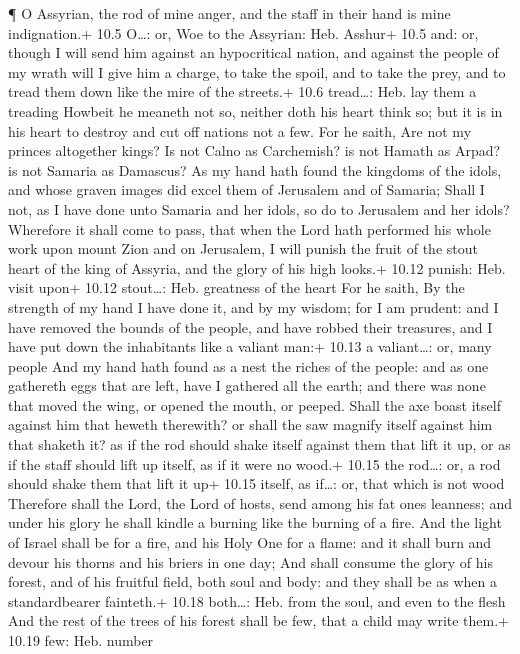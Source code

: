  ¶ O Assyrian, the rod of mine anger, and the staff in their
hand is mine indignation.+ 10.5 O\ldots: or, Woe to the Assyrian: Heb.
Asshur+ 10.5 and: or, though  I will send him against an
hypocritical nation, and against the people of my wrath will I give him
a charge, to take the spoil, and to take the prey, and to tread them
down like the mire of the streets.+ 10.6 tread\ldots: Heb. lay them a
treading  Howbeit he meaneth not so, neither doth his heart
think so; but it is in his heart to destroy and cut off nations not a
few.  For he saith, Are not my princes altogether kings?
 Is not Calno as Carchemish? is not Hamath as Arpad? is not
Samaria as Damascus?  As my hand hath found the kingdoms of
the idols, and whose graven images did excel them of Jerusalem and of
Samaria;  Shall I not, as I have done unto Samaria and her
idols, so do to Jerusalem and her idols?  Wherefore it
shall come to pass, that when the Lord hath performed his whole work
upon mount Zion and on Jerusalem, I will punish the fruit of the stout
heart of the king of Assyria, and the glory of his high looks.+ 10.12
punish: Heb. visit upon+ 10.12 stout\ldots: Heb. greatness of the heart
 For he saith, By the strength of my hand I have done it,
and by my wisdom; for I am prudent: and I have removed the bounds of the
people, and have robbed their treasures, and I have put down the
inhabitants like a valiant man:+ 10.13 a valiant\ldots: or, many people
 And my hand hath found as a nest the riches of the people:
and as one gathereth eggs that are left, have I gathered all the earth;
and there was none that moved the wing, or opened the mouth, or peeped.
 Shall the axe boast itself against him that heweth
therewith? or shall the saw magnify itself against him that shaketh it?
as if the rod should shake itself against them that lift it up, or as if
the staff should lift up itself, as if it were no wood.+ 10.15 the
rod\ldots: or, a rod should shake them that lift it up+ 10.15 itself, as
if\ldots: or, that which is not wood  Therefore shall the
Lord, the Lord of hosts, send among his fat ones leanness; and under his
glory he shall kindle a burning like the burning of a fire.
 And the light of Israel shall be for a fire, and his Holy
One for a flame: and it shall burn and devour his thorns and his briers
in one day;  And shall consume the glory of his forest, and
of his fruitful field, both soul and body: and they shall be as when a
standardbearer fainteth.+ 10.18 both\ldots: Heb. from the soul, and even
to the flesh  And the rest of the trees of his forest shall
be few, that a child may write them.+ 10.19 few: Heb. number

